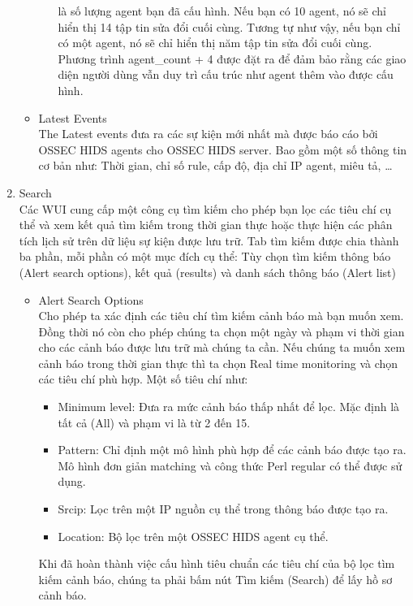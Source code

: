 \begin{enumerate}
\begin{itemize}
\begin{itemize}
    là số lượng agent bạn đã cấu hình. Nếu bạn có 10 agent, nó sẽ chỉ hiển thị
    14 tập tin sửa đổi cuối cùng. Tương tự như vậy, nếu bạn chỉ có một agent, nó
    sẽ chỉ hiển thị năm tập tin sửa đổi cuối cùng. Phương trình agent\_count + 4
    được đặt ra để đảm bảo rằng các giao diện người dùng vẫn duy trì cấu trúc như agent thêm vào được cấu hình.
    \end{itemize}
    \item Latest Events\\
    The Latest events đưa ra các sự kiện mới nhất mà được báo cáo bởi OSSEC HIDS
    agents cho OSSEC HIDS server. Bao gồm một số thông tin cơ bản như: Thời
    gian, chỉ số rule, cấp độ, địa chỉ IP agent, miêu tả, \ldots
   \end{itemize}
   \item Search\\
   Các WUI cung cấp một công cụ tìm kiếm cho phép bạn lọc các tiêu chí cụ thể và
   xem kết quả tìm kiếm trong thời gian thực hoặc thực hiện các phân tích lịch sử trên dữ liệu sự kiện được lưu trữ. Tab tìm kiếm được chia thành ba phần, mỗi phần có một mục đích cụ thể: Tùy chọn tìm kiếm thông báo (Alert search options), kết quả (results) và danh sách thông báo (Alert list)
   \begin{itemize}
     \item Alert Search Options\\
     Cho phép ta xác định các tiêu chí tìm kiếm cảnh báo mà bạn muốn xem.
     Đồng thời nó còn cho phép chúng ta chọn một ngày và phạm vi thời gian cho các cảnh báo được lưu trữ mà chúng ta cần. Nếu chúng ta muốn xem cảnh báo trong thời gian thực thì ta chọn Real time monitoring và chọn các tiêu chí phù hợp. Một số tiêu chí như:
     \begin{itemize}
       \item Minimum level: Đưa ra mức cảnh báo thấp nhất để lọc. Mặc định là
       tất cả (All) và phạm vi là từ 2 đến 15.
       \item Pattern: Chỉ định một mô hình phù hợp để các cảnh báo được tạo ra.
       Mô hình đơn giản matching và công thức Perl regular có thể được sử dụng.
       \item Srcip: Lọc trên một IP nguồn cụ thể trong thông báo được tạo ra.
       \item Location: Bộ lọc trên một OSSEC HIDS agent cụ thể.
     \end{itemize}
     Khi đã hoàn thành việc cấu hình tiêu chuẩn các tiêu chí của bộ lọc tìm kiếm
     cảnh báo, chúng ta phải bấm nút Tìm kiếm (Search) để lấy hồ sơ cảnh báo.

\end{itemize}
\end{enumerate}
